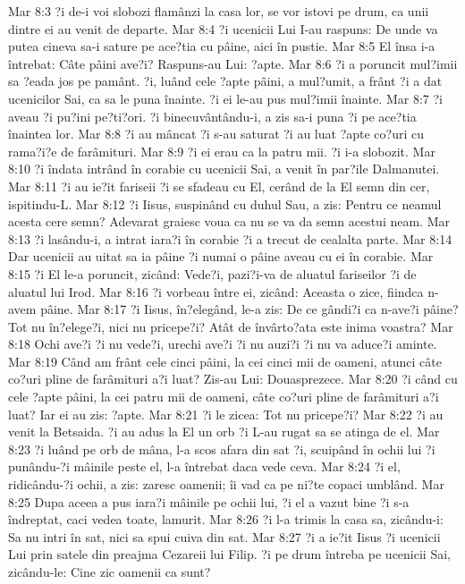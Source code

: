 Mar 8:3  ?i de-i voi slobozi flamânzi la casa lor, se vor istovi pe drum, ca unii dintre ei au venit de departe.
Mar 8:4  ?i ucenicii Lui I-au raspuns: De unde va putea cineva sa-i sature pe ace?tia cu pâine, aici în pustie.
Mar 8:5  El însa i-a întrebat: Câte pâini ave?i? Raspuns-au Lui: ?apte.
Mar 8:6  ?i a poruncit mul?imii sa ?eada jos pe pamânt. ?i, luând cele ?apte pâini, a mul?umit, a frânt ?i a dat ucenicilor Sai, ca sa le puna înainte. ?i ei le-au pus mul?imii înainte.
Mar 8:7  ?i aveau ?i pu?ini pe?ti?ori. ?i binecuvântându-i, a zis sa-i puna ?i pe ace?tia înaintea lor.
Mar 8:8  ?i au mâncat ?i s-au saturat ?i au luat ?apte co?uri cu rama?i?e de farâmituri.
Mar 8:9  ?i ei erau ca la patru mii. ?i i-a slobozit.
Mar 8:10  ?i îndata intrând în corabie cu ucenicii Sai, a venit în par?ile Dalmanutei.
Mar 8:11  ?i au ie?it fariseii ?i se sfadeau cu El, cerând de la El semn din cer, ispitindu-L.
Mar 8:12  ?i Iisus, suspinând cu duhul Sau, a zis: Pentru ce neamul acesta cere semn? Adevarat graiesc voua ca nu se va da semn acestui neam.
Mar 8:13  ?i lasându-i, a intrat iara?i în corabie ?i a trecut de cealalta parte.
Mar 8:14  Dar ucenicii au uitat sa ia pâine ?i numai o pâine aveau cu ei în corabie.
Mar 8:15  ?i El le-a poruncit, zicând: Vede?i, pazi?i-va de aluatul fariseilor ?i de aluatul lui Irod.
Mar 8:16  ?i vorbeau între ei, zicând: Aceasta o zice, fiindca n-avem pâine.
Mar 8:17  ?i Iisus, în?elegând, le-a zis: De ce gândi?i ca n-ave?i pâine? Tot nu în?elege?i, nici nu pricepe?i? Atât de învârto?ata este inima voastra?
Mar 8:18  Ochi ave?i ?i nu vede?i, urechi ave?i ?i nu auzi?i ?i nu va aduce?i aminte.
Mar 8:19  Când am frânt cele cinci pâini, la cei cinci mii de oameni, atunci câte co?uri pline de farâmituri a?i luat? Zis-au Lui: Douasprezece.
Mar 8:20  ?i când cu cele ?apte pâini, la cei patru mii de oameni, câte co?uri pline de farâmituri a?i luat? Iar ei au zis: ?apte.
Mar 8:21  ?i le zicea: Tot nu pricepe?i?
Mar 8:22  ?i au venit la Betsaida. ?i au adus la El un orb ?i L-au rugat sa se atinga de el.
Mar 8:23  ?i luând pe orb de mâna, l-a scos afara din sat ?i, scuipând în ochii lui ?i punându-?i mâinile peste el, l-a întrebat daca vede ceva.
Mar 8:24  ?i el, ridicându-?i ochii, a zis: zaresc oamenii; îi vad ca pe ni?te copaci umblând.
Mar 8:25  Dupa aceea a pus iara?i mâinile pe ochii lui, ?i el a vazut bine ?i s-a îndreptat, caci vedea toate, lamurit.
Mar 8:26  ?i l-a trimis la casa sa, zicându-i: Sa nu intri în sat, nici sa spui cuiva din sat.
Mar 8:27  ?i a ie?it Iisus ?i ucenicii Lui prin satele din preajma Cezareii lui Filip. ?i pe drum întreba pe ucenicii Sai, zicându-le: Cine zic oamenii ca sunt?
